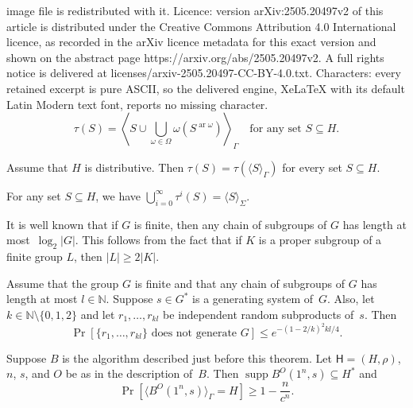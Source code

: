 \documentclass[10pt,a4paper]{amsart}
\DeclareMathOperator{\ar}{ar}
\DeclareMathOperator{\supp}{supp}
\newcommand{\GP}[1]{\left\langle#1\right\rangle_\Gamma}
\newcommand{\N}{\mathbb N}
\newcommand{\Prob}[1]{\Pr[#1]}
\newcommand{\acl}[1]{\lvert#1\rvert}
\newcommand{\alg}[1]{\langle#1\rangle}
\newcommand{\bb}{\mathsf}
\newcommand{\gp}[1]{\langle#1\rangle_\Gamma}
\begin{document}
image file is redistributed with it. Licence: version arXiv:2505.20497v2 of this article is distributed under the Creative Commons Attribution 4.0 International licence, as recorded in the arXiv licence metadata for this exact version and shown on the abstract page https://arxiv.org/abs/2505.20497v2. A full rights notice is delivered at licenses/arxiv-2505.20497-CC-BY-4.0.txt. Characters: every retained excerpt is pure ASCII, so the delivered engine, XeLaTeX with its default Latin Modern text font, reports no missing character.
\begin{equation}
\label{e:tau}
\tau(S)
=\GP{S\cup\bigcup_{\omega\in\Omega}\omega(S^{\ar\omega})}
\quad\text{for any set }S\subseteq H.
\end{equation}

\begin{lem}
\label{l:tauSeqtaugpS}
Assume that $H$ is distributive. Then $\tau(S)=\tau(\gp S)$
for every set $S\subseteq H$.
\end{lem}

\begin{lem}
\label{l:uniontauiSeqalgSSigma}
For any set $S\subseteq H$, we have
$\bigcup_{i=0}^\infty\tau^i(S)=\alg S_\Sigma$.
\end{lem}

\begin{rem}
\label{r:lenofchofsubgr}
It is well known that if $G$ is finite, then any chain of
subgroups of $G$ has length at most~$\log_2\acl G$. This
follows from the fact that if $K$ is a proper subgroup of a
finite group $L$, then $\acl L\ge2\acl K$.
\end{rem}

\begin{lem}
\label{l:Prrandsubprdonotgen}
Assume that the group $G$ is finite and that any chain of
subgroups of $G$ has length at most $l\in\N$. Suppose $s\in
G^*$ is a generating system of~$G$. Also, let
$k\in\N\setminus\{0,1,2\}$ and let $r_1,\dots,r_{kl}$ be
independent random subproducts of~$s$. Then
\[
\Prob{\{r_1,\dots,r_{kl}\}\text{ does not generate }G}\le
e^{-(1-2/k)^2kl/4}.
\]
\end{lem}

\begin{thm}
\label{t:compgensysofaddgr}
Suppose $B$ is the algorithm described just before this
theorem. Let $\bb H=(H,\rho)$, $n$, $s$, and $O$ be as in
the description of~$B$. Then $\supp B^O(1^n,s)\subseteq H^*$
and
\begin{equation}
\label{e:PrgpBO1nseqH}
\Prob{\gp{B^O(1^n,s)}=H}\ge1-\frac n{c^n}.
\end{equation}
\end{thm}
\end{document}
